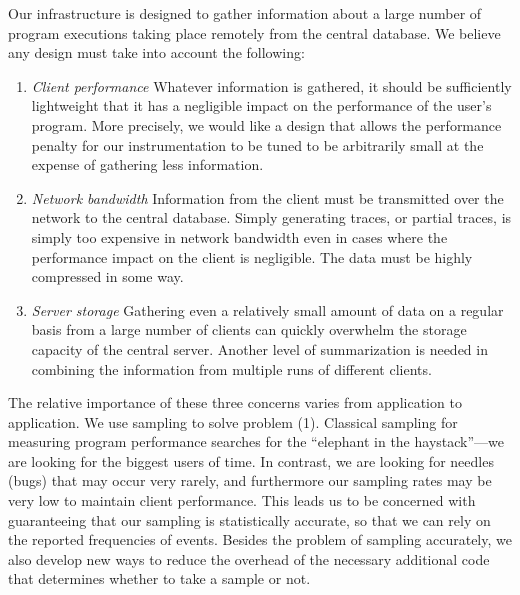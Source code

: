Our infrastructure is designed to gather information about a
large number of program executions taking place remotely from
the central database.  We believe any design must take into account
the following:
\begin{enumerate}

\item {\em Client performance}  Whatever information is gathered,
it should be sufficiently lightweight that it has a negligible impact
on the performance of the user's program.  More precisely, we would
like a design that allows the performance penalty for our
instrumentation to be tuned to be arbitrarily small at the expense of
gathering less information.

\item {\em Network bandwidth}  Information from the client must
be transmitted over the network to the central database.  Simply
generating traces, or partial traces, is simply too expensive in
network bandwidth even in cases where the performance impact on the
client is negligible.  The data must be highly compressed in some way.

\item {\em Server storage}  Gathering even a relatively small amount of data 
on a regular basis from a large number of clients can quickly 
overwhelm the storage capacity of the central server.  Another level
of summarization is needed in combining the information from 
multiple runs of different clients.

\end{enumerate}

The relative importance of these three concerns varies from
application to application.  We use sampling to solve problem (1).
Classical sampling for measuring program performance searches for the
``elephant in the haystack''---we are looking for the biggest users of
time.  In contrast, we are looking for needles (bugs) that may occur
very rarely, and furthermore our sampling rates may be very low to
maintain client performance.  This leads us to be concerned with
guaranteeing that our sampling is statistically accurate, so that we
can rely on the reported frequencies of events.  Besides the problem
of sampling accurately, we also develop new ways to reduce the
overhead of the necessary additional code that determines whether to
take a sample or not.

